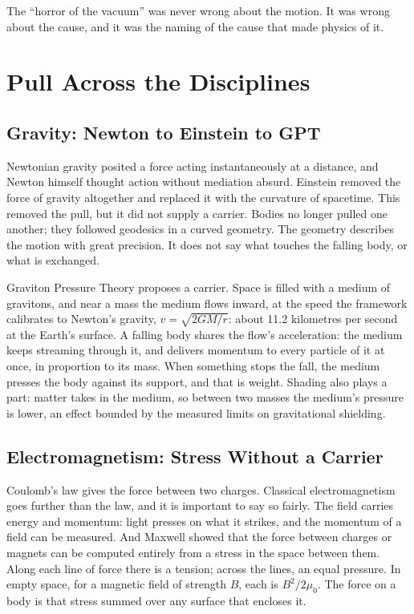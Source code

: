 \documentclass[11pt,a4paper]{article}
\begin{document}
 The ``horror of the vacuum'' was never wrong about the motion. It was wrong about the cause, and it was the naming of the cause that made physics of it.

\section{Pull Across the Disciplines}

\subsection*{Gravity: Newton to Einstein to GPT}

Newtonian gravity posited a force acting instantaneously at a distance, and Newton himself thought action without mediation absurd. Einstein removed the force of gravity altogether and replaced it with the curvature of spacetime. This removed the pull, but it did not supply a carrier. Bodies no longer pulled one another; they followed geodesics in a curved geometry. The geometry describes the motion with great precision. It does not say what touches the falling body, or what is exchanged.

\begin{hypbar}
Graviton Pressure Theory proposes a carrier. Space is filled with a medium of gravitons, and near a mass the medium flows inward, at the speed the framework calibrates to Newton's gravity, $v=\sqrt{2GM/r}$: about 11.2 kilometres per second at the Earth's surface. A falling body shares the flow's acceleration: the medium keeps streaming through it, and delivers momentum to every particle of it at once, in proportion to its mass. When something stops the fall, the medium presses the body against its support, and that is weight. Shading also plays a part: matter takes in the medium, so between two masses the medium's pressure is lower, an effect bounded by the measured limits on gravitational shielding.\footnotemark{}
\end{hypbar}

\subsection*{Electromagnetism: Stress Without a Carrier}
\label{sec:em}

Coulomb's law gives the force between two charges. Classical electromagnetism goes further than the law, and it is important to say so fairly. The field carries energy and momentum: light presses on what it strikes, and the momentum of a field can be measured. And Maxwell showed that the force between charges or magnets can be computed entirely from a stress in the space between them. Along each line of force there is a tension; across the lines, an equal pressure. In empty space, for a magnetic field of strength $B$, each is $B^2/2\mu_0$. The force on a body is that stress summed over any surface that encloses it.
\end{document}

